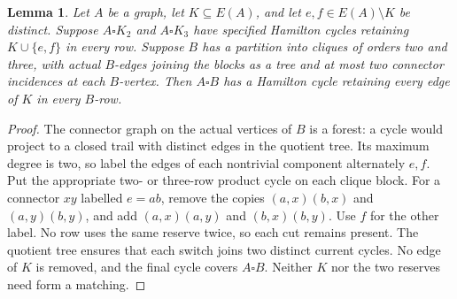 \documentclass[11pt]{article}
\newtheorem{lemma}[theorem]{Lemma}
\theoremstyle{remark}
\numberwithin{equation}{section}
\numberwithin{table}{section}
\begin{document}
\begin{lemma}\label{lem:clique-block-product}
Let $A$ be a graph, let $K\subseteq E(A)$, and let
$e,f\in E(A)\setminus K$ be distinct. Suppose $A\square K_2$ and
$A\square K_3$ have specified Hamilton cycles retaining
$K\cup\{e,f\}$ in every row. Suppose $B$ has a partition
into cliques of orders two and three, with actual $B$-edges joining
the blocks as a tree and at most two connector incidences at each
$B$-vertex. Then $A\square B$ has a Hamilton cycle retaining
every edge of $K$ in every $B$-row.
\end{lemma}
\begin{proof}
The connector graph on the actual vertices of $B$ is a forest: a cycle
would project to a closed trail with distinct edges in the quotient tree.
Its maximum degree is two, so label the edges of each nontrivial component
alternately $e,f$. Put the appropriate two- or three-row product cycle on each
clique block. For a connector $xy$ labelled $e=ab$, remove the copies
$(a,x)(b,x)$ and $(a,y)(b,y)$, and add $(a,x)(a,y)$ and $(b,x)(b,y)$.
Use $f$ for the other label. No row uses the same reserve twice, so each
cut remains present. The quotient tree ensures that each switch joins
two distinct current cycles. No edge of $K$ is removed, and the final
cycle covers $A\square B$. Neither $K$ nor the two reserves need form
a matching.
\end{proof}
\end{document}
